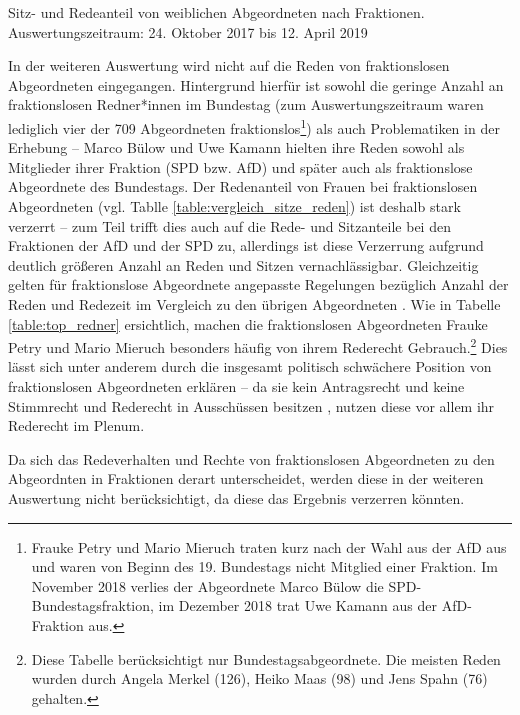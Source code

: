 \documentclass[12pt, 
    twoside=false, 
    bibliography=totoc, 
    numbers=endperiod, 
    headings=normal, 
    toc=chapterentrydotfill
    ]{scrbook}
\begin{document}
\begin{table}[htb]
    \centering
    \caption[Sitz- und Redeanteil von weiblichen Abgeordneten nach Fraktionen]{Sitz- und Redeanteil von weiblichen Abgeordneten nach Fraktionen. Auswertungszeitraum: 24. Oktober 2017 bis 12. April 2019}
    
    \label{table:vergleich_sitze_reden}
\end{table}

In der weiteren Auswertung wird nicht auf die Reden von fraktionslosen Abgeordneten eingegangen. Hintergrund hierfür ist sowohl die geringe Anzahl an fraktionslosen Redner*innen im Bundestag (zum Auswertungszeitraum waren lediglich vier der 709 Abgeordneten fraktionslos\footnote{Frauke Petry und Mario Mieruch traten kurz nach der Wahl aus der AfD aus und waren von Beginn des 19. Bundestags nicht Mitglied einer Fraktion. Im November 2018 verlies der Abgeordnete Marco Bülow die SPD-Bundestagsfraktion, im Dezember 2018 trat Uwe Kamann aus der AfD-Fraktion aus.}) als auch Problematiken in der Erhebung -- Marco Bülow und Uwe Kamann hielten ihre Reden sowohl als Mitglieder ihrer Fraktion (SPD bzw. AfD) und später auch als fraktionslose Abgeordnete des Bundestags. Der Redenanteil von Frauen bei fraktionslosen Abgeordneten (vgl. Tablle \ref{table:vergleich_sitze_reden}) ist deshalb stark verzerrt -- zum Teil trifft dies auch auf die Rede- und Sitzanteile bei den Fraktionen der AfD und der SPD zu, allerdings ist diese Verzerrung aufgrund deutlich größeren Anzahl an Reden und Sitzen vernachlässigbar.
Gleichzeitig gelten für fraktionslose Abgeordnete angepasste Regelungen bezüglich Anzahl der Reden und Redezeit im Vergleich zu den übrigen Abgeordneten \parencite[vgl.][583f.]{schreiner_2005}. Wie in Tabelle \ref{table:top_redner} ersichtlich, machen die fraktionslosen Abgeordneten Frauke Petry und Mario Mieruch besonders häufig von ihrem Rederecht Gebrauch.\footnote{Diese Tabelle berücksichtigt nur Bundestagsabgeordnete. Die meisten Reden wurden durch Angela Merkel (126), Heiko Maas (98) und Jens Spahn (76) gehalten.} Dies lässt sich unter anderem durch die insgesamt politisch schwächere Position von fraktionslosen Abgeordneten erklären \parencite[372]{morlok_2018} -- da sie kein Antragsrecht und keine Stimmrecht und Rederecht in Ausschüssen besitzen \parencite[vgl.][]{morlok_2018}, nutzen diese vor allem ihr Rederecht im Plenum.

Da sich das Redeverhalten und Rechte von fraktionslosen Abgeordneten zu den Abgeordnten in Fraktionen derart unterscheidet, werden diese in der weiteren Auswertung nicht berücksichtigt, da diese das Ergebnis verzerren könnten.
\end{document}

